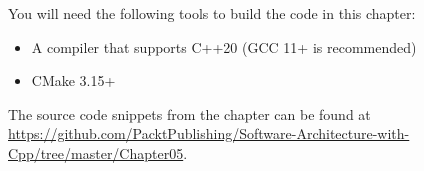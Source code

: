 
You will need the following tools to build the code in this chapter:

\begin{itemize}
\item A compiler that supports C++20 (GCC 11+ is recommended)
\item CMake 3.15+
\end{itemize}

The source code snippets from the chapter can be found at \url{https://github.com/PacktPublishing/Software-Architecture-with-Cpp/tree/master/Chapter05}.